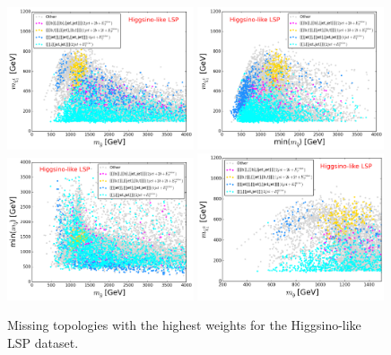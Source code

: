 \documentclass[a4paper,11pt]{article}
\begin{document}
%
\begin{figure}[!]
\begin{center}
\subfigure
\includegraphics[width=0.49\textwidth]{PLOTS/Missing/HIGGSINO_Missing_GluNeu.png}
\subfigure
{\includegraphics[width=0.49\textwidth]{PLOTS/Missing/HIGGSINO_Missing_SqNeu.png}}
\subfigure
{\includegraphics[width=0.49\textwidth]{PLOTS/Missing/HIGGSINO_Missing_GluSq.png}}
\subfigure
{\includegraphics[width=0.49\textwidth]{PLOTS/Missing/HIGGSINO_Zoom_Missing_GluNeu.png}}
\end{center}
\caption{Missing topologies with the highest weights for the Higgsino-like LSP dataset.} 
\label{Missing_Higgsino}
\end{figure}
%
\end{document}

